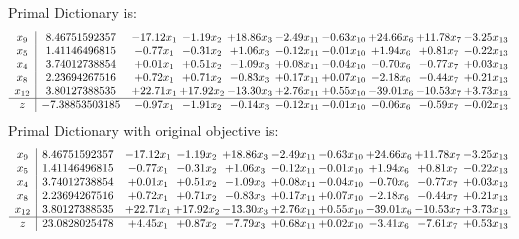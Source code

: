 \documentclass[9pt]{article}
\begin{document}
Primal Dictionary is:
\[\begin{array}{c| c c@{\hskip 2pt} c@{\hskip 2pt} c@{\hskip 2pt} c@{\hskip 2pt} c@{\hskip 2pt} c@{\hskip 2pt} c@{\hskip 2pt} c@{\hskip 2pt} }
 x_{9}   &  8.46751592357 & -17.12 x_{1} & -1.19 x_{2} & + 18.86 x_{3} & -2.49 x_{11} & -0.63 x_{10} & + 24.66 x_{6} & + 11.78 x_{7} & -3.25 x_{13}\\
 x_{5}   &  1.41146496815 & -0.77 x_{1} & -0.31 x_{2} & +  1.06 x_{3} & -0.12 x_{11} & -0.01 x_{10} & +  1.94 x_{6} & +  0.81 x_{7} & -0.22 x_{13}\\
 x_{4}   &  3.74012738854 & +  0.01 x_{1} & +  0.51 x_{2} & -1.09 x_{3} & +  0.08 x_{11} & -0.04 x_{10} & -0.70 x_{6} & -0.77 x_{7} & +  0.03 x_{13}\\
 x_{8}   &  2.23694267516 & +  0.72 x_{1} & +  0.71 x_{2} & -0.83 x_{3} & +  0.17 x_{11} & +  0.07 x_{10} & -2.18 x_{6} & -0.44 x_{7} & +  0.21 x_{13}\\
 x_{12}   &  3.80127388535 & + 22.71 x_{1} & + 17.92 x_{2} & -13.30 x_{3} & +  2.76 x_{11} & +  0.55 x_{10} & -39.01 x_{6} & -10.53 x_{7} & +  3.73 x_{13}\\
\hline
z    &  -7.38853503185 & -0.97 x_{1} & -1.91 x_{2} & -0.14 x_{3} & -0.12 x_{11} & -0.01 x_{10} & -0.06 x_{6} & -0.59 x_{7} & -0.02 x_{13}\\
\end{array}\]
Primal Dictionary with original objective is:
\[\begin{array}{c| c c@{\hskip 2pt} c@{\hskip 2pt} c@{\hskip 2pt} c@{\hskip 2pt} c@{\hskip 2pt} c@{\hskip 2pt} c@{\hskip 2pt} c@{\hskip 2pt} }
 x_{9}   &  8.46751592357 & -17.12 x_{1} & -1.19 x_{2} & + 18.86 x_{3} & -2.49 x_{11} & -0.63 x_{10} & + 24.66 x_{6} & + 11.78 x_{7} & -3.25 x_{13}\\
 x_{5}   &  1.41146496815 & -0.77 x_{1} & -0.31 x_{2} & +  1.06 x_{3} & -0.12 x_{11} & -0.01 x_{10} & +  1.94 x_{6} & +  0.81 x_{7} & -0.22 x_{13}\\
 x_{4}   &  3.74012738854 & +  0.01 x_{1} & +  0.51 x_{2} & -1.09 x_{3} & +  0.08 x_{11} & -0.04 x_{10} & -0.70 x_{6} & -0.77 x_{7} & +  0.03 x_{13}\\
 x_{8}   &  2.23694267516 & +  0.72 x_{1} & +  0.71 x_{2} & -0.83 x_{3} & +  0.17 x_{11} & +  0.07 x_{10} & -2.18 x_{6} & -0.44 x_{7} & +  0.21 x_{13}\\
 x_{12}   &  3.80127388535 & + 22.71 x_{1} & + 17.92 x_{2} & -13.30 x_{3} & +  2.76 x_{11} & +  0.55 x_{10} & -39.01 x_{6} & -10.53 x_{7} & +  3.73 x_{13}\\
\hline
z    &  23.0828025478 & +  4.45 x_{1} & +  0.87 x_{2} & -7.79 x_{3} & +  0.68 x_{11} & +  0.02 x_{10} & -3.41 x_{6} & -7.61 x_{7} & +  0.53 x_{13}\\
\end{array}\]
\end{document}
